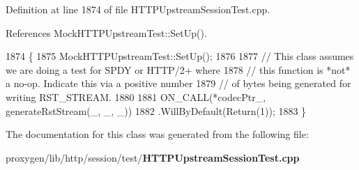 Definition at line 1874 of file H\+T\+T\+P\+Upstream\+Session\+Test.\+cpp.



References Mock\+H\+T\+T\+P\+Upstream\+Test\+::\+Set\+Up().


\begin{DoxyCode}
1874                         \{
1875     MockHTTPUpstreamTest::SetUp();
1876 
1877     \textcolor{comment}{// This class assumes we are doing a test for SPDY or HTTP/2+ where}
1878     \textcolor{comment}{// this function is *not* a no-op. Indicate this via a positive number}
1879     \textcolor{comment}{// of bytes being generated for writing RST\_STREAM.}
1880 
1881     ON\_CALL(*codecPtr_, generateRstStream(\_, \_, \_))
1882       .WillByDefault(Return(1));
1883   \}
\end{DoxyCode}


The documentation for this class was generated from the following file\+:\begin{DoxyCompactItemize}
\item 
proxygen/lib/http/session/test/{\bf H\+T\+T\+P\+Upstream\+Session\+Test.\+cpp}\end{DoxyCompactItemize}
